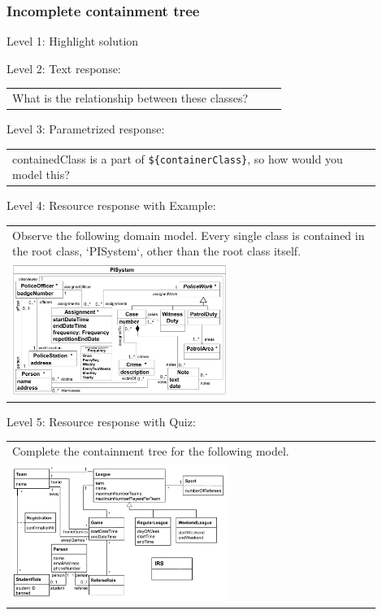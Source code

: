 \subsubsection{Incomplete containment tree}

\noindent Level 1: Highlight solution \medskip

\noindent Level 2: Text response: \medskip

\begin{tabular}{|p{0.9\linewidth}}
What is the relationship between these classes?
\end{tabular} \medskip

\noindent Level 3: Parametrized response: \medskip

\begin{tabular}{|p{0.9\linewidth}}
{containedClass} is a part of \verb|${containerClass}|, so how would you model this?
\end{tabular} \medskip

\noindent Level 4: Resource response with Example: \medskip

\begin{tabular}{|p{0.9\linewidth}}
Observe the following domain model. Every single class is contained in the 
root class, `PISystem`, other than the root class itself.

\\
\includegraphics[width=0.6\textwidth]{images/PISystem.png}
\end{tabular} \medskip

\noindent Level 5: Resource response with Quiz: \medskip

\begin{tabular}{|p{0.9\linewidth}}
Complete the containment tree for the following model.

\\
\includegraphics[width=0.6\textwidth]{images/IRS.png}
\end{tabular} \medskip


